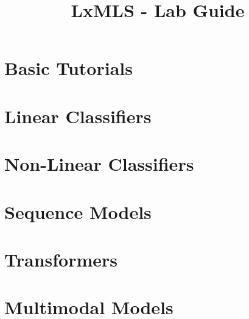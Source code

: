 \documentclass{report}
\begin{document}
\title{LxMLS - Lab Guide}

\maketitle

\tableofcontents

\renewcommand{\chaptername}{Day}
\setcounter{chapter}{-1}

\chapter{Basic Tutorials}


\chapter{\label{day:classification}Linear Classifiers}


\chapter{Non-Linear Classifiers}


\chapter{\label{day:seq}Sequence Models}

% 

\chapter{Transformers}
\let\thefootnote\relax{}


\chapter{Multimodal Models}


%
\end{document}

